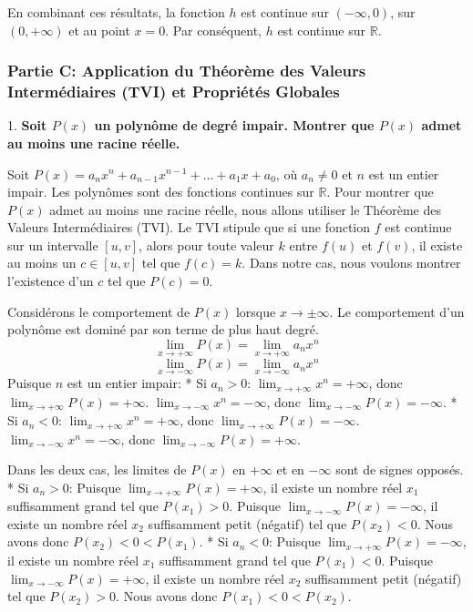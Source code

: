 \documentclass[12pt,a4paper]{report}
\begin{document}
    En combinant ces résultats, la fonction $h$ est continue sur $(-\infty, 0)$, sur $(0, +\infty)$ et au point $x=0$. Par conséquent, $h$ est continue sur $\mathbb{R}$.

\subsubsection{Partie C: Application du Théorème des Valeurs Intermédiaires (TVI) et Propriétés Globales}

1.  \textbf{Soit $P(x)$ un polynôme de degré impair. Montrer que $P(x)$ admet au moins une racine réelle.}

    Soit $P(x) = a_n x^n + a_{n-1} x^{n-1} + \dots + a_1 x + a_0$, où $a_n \neq 0$ et $n$ est un entier impair.
    Les polynômes sont des fonctions continues sur $\mathbb{R}$.
    Pour montrer que $P(x)$ admet au moins une racine réelle, nous allons utiliser le Théorème des Valeurs Intermédiaires (TVI). Le TVI stipule que si une fonction $f$ est continue sur un intervalle $[u, v]$, alors pour toute valeur $k$ entre $f(u)$ et $f(v)$, il existe au moins un $c \in [u, v]$ tel que $f(c) = k$. Dans notre cas, nous voulons montrer l'existence d'un $c$ tel que $P(c) = 0$.

    Considérons le comportement de $P(x)$ lorsque $x \to \pm \infty$. Le comportement d'un polynôme est dominé par son terme de plus haut degré.
    $$ \lim_{x \to +\infty} P(x) = \lim_{x \to +\infty} a_n x^n $$
    $$ \lim_{x \to -\infty} P(x) = \lim_{x \to -\infty} a_n x^n $$
    Puisque $n$ est un entier impair:
    *   Si $a_n > 0$:
        $\lim_{x \to +\infty} x^n = +\infty$, donc $\lim_{x \to +\infty} P(x) = +\infty$.
        $\lim_{x \to -\infty} x^n = -\infty$, donc $\lim_{x \to -\infty} P(x) = -\infty$.
    *   Si $a_n < 0$:
        $\lim_{x \to +\infty} x^n = +\infty$, donc $\lim_{x \to +\infty} P(x) = -\infty$.
        $\lim_{x \to -\infty} x^n = -\infty$, donc $\lim_{x \to -\infty} P(x) = +\infty$.

    Dans les deux cas, les limites de $P(x)$ en $+\infty$ et en $-\infty$ sont de signes opposés.
    *   Si $a_n > 0$:
        Puisque $\lim_{x \to +\infty} P(x) = +\infty$, il existe un nombre réel $x_1$ suffisamment grand tel que $P(x_1) > 0$.
        Puisque $\lim_{x \to -\infty} P(x) = -\infty$, il existe un nombre réel $x_2$ suffisamment petit (négatif) tel que $P(x_2) < 0$.
        Nous avons donc $P(x_2) < 0 < P(x_1)$.
    *   Si $a_n < 0$:
        Puisque $\lim_{x \to +\infty} P(x) = -\infty$, il existe un nombre réel $x_1$ suffisamment grand tel que $P(x_1) < 0$.
        Puisque $\lim_{x \to -\infty} P(x) = +\infty$, il existe un nombre réel $x_2$ suffisamment petit (négatif) tel que $P(x_2) > 0$.
        Nous avons donc $P(x_1) < 0 < P(x_2)$.
\end{document}
